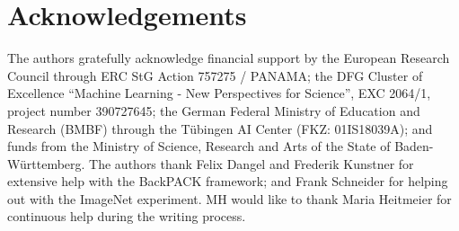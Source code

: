 \section*{Acknowledgements}

The authors gratefully acknowledge financial support by the European Research Council through ERC StG Action 757275 / PANAMA; the DFG Cluster of Excellence “Machine Learning - New Perspectives for Science”, EXC 2064/1, project number 390727645; the German Federal Ministry of Education and Research (BMBF) through the T{\"u}bingen AI Center (FKZ: 01IS18039A); and funds from the Ministry of Science, Research and Arts of the State of Baden-W{\"u}rttemberg. The authors thank Felix Dangel and Frederik Kunstner for extensive help with the BackPACK framework; and Frank Schneider for helping out with the ImageNet experiment. MH would like to thank Maria Heitmeier for continuous help during the writing process.
